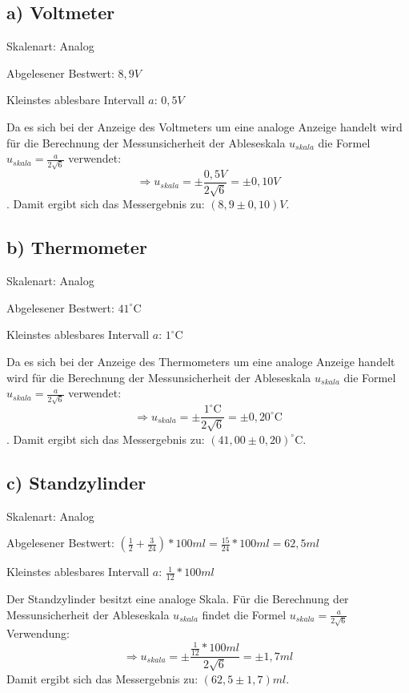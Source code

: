 \documentclass[
]{article}
\begin{document}
\hypertarget{a-voltmeter}{%
\subsection{a) Voltmeter}\label{a-voltmeter}}

Skalenart: Analog

Abgelesener Bestwert: \(8,9 V\)

Kleinstes ablesbare Intervall \(a\): \(0,5V\)

Da es sich bei der Anzeige des Voltmeters um eine analoge Anzeige handelt wird für die Berechnung der Messunsicherheit der Ableseskala \(u_{skala}\) die Formel \(u_{skala}=\frac{a}{2\sqrt{6}}\) verwendet:
\[\Rightarrow u_{skala} = \pm\frac{0,5V}{2\sqrt{6}} = \pm 0,10V\]. 
Damit ergibt sich das Messergebnis zu: \((8,9\pm0,10)V\).

\hypertarget{b-thermometer}{%
\subsection{b) Thermometer}\label{b-thermometer}}

Skalenart: Analog

Abgelesener Bestwert: \(41^\circ\text{C}\)

Kleinstes ablesbares Intervall \(a\): \(1^\circ\text{C}\)

Da es sich bei der Anzeige des Thermometers um eine analoge Anzeige handelt wird für die Berechnung der Messunsicherheit der Ableseskala \(u_{skala}\) die Formel \(u_{skala}=\frac{a}{2\sqrt{6}}\) verwendet: \[\Rightarrow u_{skala} = \pm\frac{1^\circ\text{C}}{2\sqrt{6}} = \pm 0,20^\circ\text{C}\].
Damit ergibt sich das Messergebnis zu: \((41,00\pm0,20)^\circ\text{C}\).

\hypertarget{c-standzylinder}{%
\subsection{c) Standzylinder}\label{c-standzylinder}}

Skalenart: Analog

Abgelesener Bestwert:
\((\frac{1}{2}+\frac{3}{24})*100ml = \frac{15}{24}*100ml= 62,5ml\)

Kleinstes ablesbares Intervall \(a\): \(\frac{1}{12}*100ml\)

Der Standzylinder besitzt eine analoge Skala. 
Für die Berechnung der Messunsicherheit der Ableseskala \(u_{skala}\) findet die Formel \(u_{skala}=\frac{a}{2\sqrt{6}}\) Verwendung: \[\Rightarrow u_{skala} = \pm\frac{\frac{1}{12}*100ml}{2\sqrt{6}} = \pm 1,7ml\]
Damit ergibt sich das Messergebnis zu: \((62,5\pm1,7)ml\).
\end{document}
